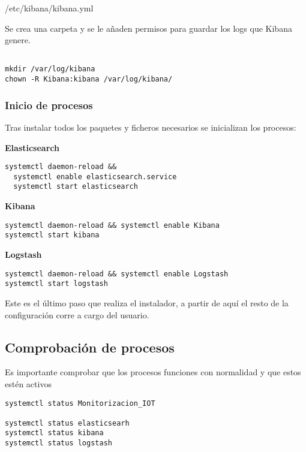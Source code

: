 /etc/kibana/kibana.yml
 
Se crea una carpeta y se le añaden permisos para guardar los logs que Kibana genere.
 
\begin{lstlisting}[frame=single]  

mkdir /var/log/kibana
chown -R Kibana:kibana /var/log/kibana/

\end{lstlisting}
 
 \subsubsection{Inicio de procesos}
 
 Tras instalar todos los paquetes y ficheros necesarios se inicializan los procesos:
 
 \textbf{Elasticsearch}
 
 \begin{lstlisting}[frame=single]  
  systemctl daemon-reload && 
  systemctl enable elasticsearch.service
  systemctl start elasticsearch
\end{lstlisting}
 
 
 \textbf{Kibana}
 
 \begin{lstlisting}[frame=single]  
systemctl daemon-reload && systemctl enable Kibana
systemctl start kibana
\end{lstlisting}
 
\textbf{Logstash}
 
\begin{lstlisting}[frame=single] 
systemctl daemon-reload && systemctl enable Logstash
systemctl start logstash

\end{lstlisting}
 
 Este es el último paso que realiza el instalador, a partir de aquí el resto de la configuración corre a cargo del usuario.
 
\subsection{Comprobación de procesos}

Es importante comprobar que los procesos funciones con normalidad y que estos estén activos 

\begin{lstlisting}[frame=single]  
systemctl status Monitorizacion_IOT

systemctl status elasticsearh
systemctl status kibana
systemctl status logstash
\end{lstlisting}


